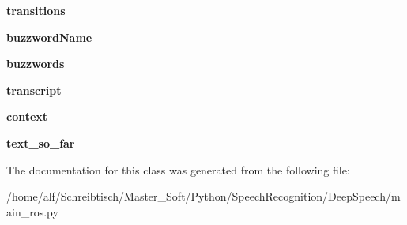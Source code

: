 \begin{DoxyCompactItemize}
\item 
\hypertarget{classmain__ros_1_1SpeechRecognition_a9aa845dcc81c95439e9304988f115e9f}{{\bfseries transitions}}\label{classmain__ros_1_1SpeechRecognition_a9aa845dcc81c95439e9304988f115e9f}

\item 
\hypertarget{classmain__ros_1_1SpeechRecognition_a0f393e1a604de4c3697933d63f9a0e3a}{{\bfseries buzzword\-Name}}\label{classmain__ros_1_1SpeechRecognition_a0f393e1a604de4c3697933d63f9a0e3a}

\item 
\hypertarget{classmain__ros_1_1SpeechRecognition_a03b2446d0162ef664a888e69d61e511c}{{\bfseries buzzwords}}\label{classmain__ros_1_1SpeechRecognition_a03b2446d0162ef664a888e69d61e511c}

\item 
\hypertarget{classmain__ros_1_1SpeechRecognition_a3bd110184d16f725efae7aab5d191b99}{{\bfseries transcript}}\label{classmain__ros_1_1SpeechRecognition_a3bd110184d16f725efae7aab5d191b99}

\item 
\hypertarget{classmain__ros_1_1SpeechRecognition_aebca4321c662bf2d578832e79a4afa48}{{\bfseries context}}\label{classmain__ros_1_1SpeechRecognition_aebca4321c662bf2d578832e79a4afa48}

\item 
\hypertarget{classmain__ros_1_1SpeechRecognition_aaf49fa7497f665f993ad18339ead5fc3}{{\bfseries text\-\_\-so\-\_\-far}}\label{classmain__ros_1_1SpeechRecognition_aaf49fa7497f665f993ad18339ead5fc3}

\end{DoxyCompactItemize}


The documentation for this class was generated from the following file\-:\begin{DoxyCompactItemize}
\item 
/home/alf/\-Schreibtisch/\-Master\-\_\-\-Soft/\-Python/\-Speech\-Recognition/\-Deep\-Speech/main\-\_\-ros.\-py\end{DoxyCompactItemize}
